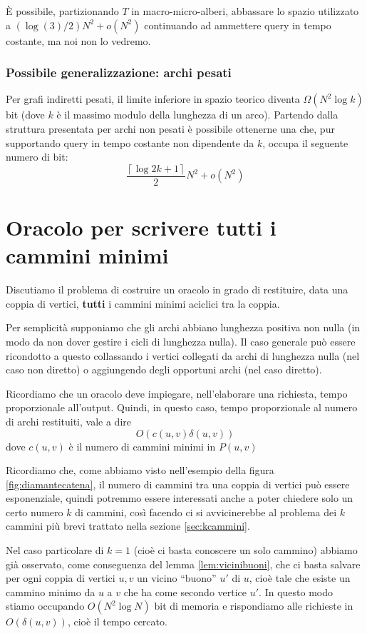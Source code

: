 \documentclass[a4paper,10pt]{amsbook}
\theoremstyle{plain}
\theoremstyle{definition}
\theoremstyle{remark}
\newcommand{\pa}[1]{\left(#1\right)}
\newcommand{\ceil}[1]{\left\lceil#1\right\rceil}
\begin{document}
\`E possibile, partizionando $T$ in macro-micro-alberi, abbassare lo
spazio utilizzato a $\pa{\log\pa{3} /2} N^2 + o(N^2)$ continuando ad
ammettere query in tempo costante, ma noi non lo vedremo.

\subsection{Possibile generalizzazione: archi pesati}

Per grafi indiretti pesati, il limite inferiore in spazio teorico
diventa $\Omega\pa{ N^2 \log k}$ bit (dove $k$ è il massimo modulo
della lunghezza di un arco). Partendo dalla struttura presentata per
archi non pesati \`e possibile ottenerne una che, pur supportando
query in tempo costante non dipendente da $k$, occupa il seguente
numero di bit:
\[ \frac{ \ceil { \log{2k+1} } }{2} N^2 + o(N^2) \]

\chapter{Oracolo per scrivere tutti i cammini minimi}
\label{chap:oracolotutticammini}

Discutiamo il problema di costruire un oracolo in grado di restituire,
data una coppia di vertici, \textbf{tutti} i cammini minimi aciclici
tra la coppia.

Per semplicit\`a supponiamo che gli archi abbiano lunghezza positiva
non nulla (in modo da non dover gestire i cicli di lunghezza
nulla). Il caso generale pu\`o essere ricondotto a questo collassando
i vertici collegati da archi di lunghezza nulla (nel caso non diretto)
o aggiungendo degli opportuni archi (nel caso diretto).

Ricordiamo che un oracolo deve impiegare, nell'elaborare una
richiesta, tempo proporzionale all'output. Quindi, in questo caso,
tempo proporzionale al numero di archi restituiti, vale a dire
\[ O\pa{ c(u,v) \delta (u,v) } \]
dove $c(u,v)$ \`e il numero di cammini minimi in $P(u,v)$

Ricordiamo che, come abbiamo visto nell'esempio della figura
\ref{fig:diamantecatena}, il numero di cammini tra una coppia di vertici
pu\`o essere esponenziale, quindi potremmo essere interessati anche a
poter chiedere solo un certo numero $k$ di cammini, cos\`i facendo ci
si avvicinerebbe al problema dei $k$ cammini pi\`u brevi trattato
nella sezione \ref{sec:kcammini}.

Nel caso particolare di $k=1$ (cio\`e ci basta conoscere un solo
cammino) abbiamo gi\`a osservato, come conseguenza del lemma
\ref{lem:vicinibuoni}, che ci basta salvare per ogni coppia di vertici
$u,v$ un vicino ``buono'' $u'$ di $u$, cio\`e tale che esiste un
cammino minimo da $u$ a $v$ che ha come secondo vertice $u'$. In
questo modo stiamo occupando $O\pa{N^2 \log N}$ bit di memoria e
rispondiamo alle richieste in $O\pa{ \delta\pa{u,v}}$, cio\`e il tempo
cercato.
\end{document}
